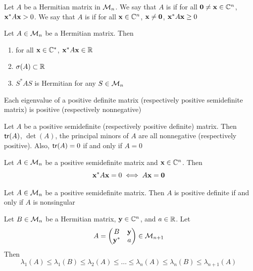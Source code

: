 \documentclass[aspectratio=169]{beamer}
\begin{document}
\begin{frame}
\begin{definition}
	Let $A$ be a Hermitian matrix in $\mathcal{M}_n$. We say that $A$ is  if for all $\b0\neq\bx\in \IC^n$, $\mathbf{x}^{*}A\mathbf{x}>0$. We say that $A$ is  if for all $\mathbf{x}\in \mathbb{C}^n$, $\bx\neq\b0$, $\mathbf{x}^* A\mathbf{x}\geq 0$
\end{definition}
\vfill
\begin{theorem}
	Let $A\in \mathcal{M}_n$ be a Hermitian matrix. Then 
	\begin{enumerate}
		\item for all $\mathbf{x}\in \mathbb{C}^*$, $\mathbf{x}^*A\mathbf{x}\in\mathbb{R}$ 
		\item $\sigma(A)\subset \mathbb{R}$
		\item $S^*AS$ is Hermitian for any $S\in \mathcal{M}_n$
	\end{enumerate}
\end{theorem}
\vfill
\begin{theorem}
	Each eigenvalue of a positive definite matrix (respectively positive semidefinite matrix) is positive (respectively nonnegative)
\end{theorem}
\end{frame}


\begin{frame}
\begin{proposition}
	Let $A$ be a positive semidefinite (respectively positive definite) matrix. Then $\mathsf{tr} (A)$, $\det(A)$, the principal minors of $A$ are all nonnegative (respectively positive). Also, $\mathsf{tr}(A)=0$ if and only if $A=0$
\end{proposition}

\begin{theorem}
	Let $A\in \mathcal{M}_n$ be a positive semidefinite matrix and $\mathbf{x}\in \mathbb{C}^n$. Then 
	\[
		\bx^*A\bx= 0 \iff A\bx=\b0
	\]
\end{theorem}

\begin{corollary}
	Let $A\in \mathcal{M}_n$ be a positive semidefinite matrix. Then $A$ is positive definite if and only if $A$ is nonsingular
\end{corollary}
\end{frame}


\begin{frame}
\begin{theorem}
	Let $B\in \mathcal{M}_n$ be a Hermitian matrix, $\mathbf{y} \in \mathbb{C}^n$, and $a\in \mathbb{R}$. Let 
	\[
		A= \begin{pmatrix}
			B& \mathbf{y}\\
			\mathbf{y}^*&a
		\end{pmatrix}\in \mathcal{M}_{n+1}
	\]
	Then 
	\[
		\lambda_1(A) \leq \lambda_1(B)\leq \lambda_2(A)\leq \dots \leq 
		\lambda_n(A)\leq \lambda_n(B) \leq \lambda_{n+1}(A)
	\]
\end{theorem}
\end{frame}
\end{document}
